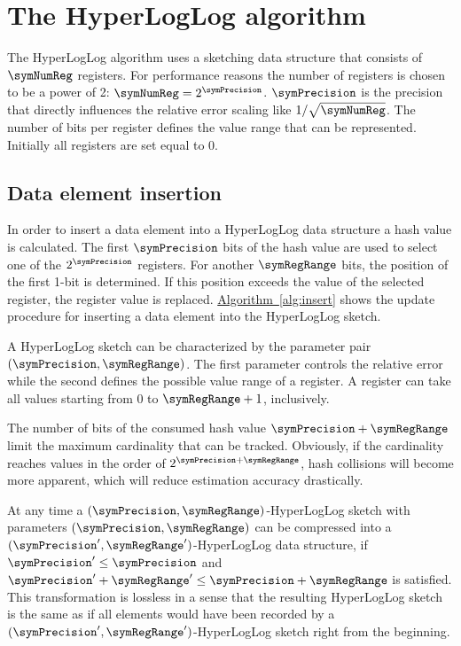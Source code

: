 \documentclass[11pt]{article} %
\newcommand*{\algoref}[1]{\hyperref[#1]{Algorithm~\ref*{#1}}}
\begin{document}

\section{The HyperLogLog algorithm}
The HyperLogLog algorithm uses a sketching data structure that consists of $\symNumReg$ registers. For performance reasons the number of registers is chosen to be a power of 2: $\symNumReg = 2^\symPrecision$. $\symPrecision$ is the precision that directly influences the relative error scaling like $1/\sqrt{\symNumReg}$. The number of bits per register defines the value range that can be represented. Initially all registers are set equal to 0. 


\subsection{Data element  insertion}
In order to insert a data element into a HyperLogLog data structure a hash value is calculated. The first $\symPrecision$ bits of the hash value are used to select one of the $2^\symPrecision$ registers. For another $\symRegRange$ bits, the position of the first 1-bit is determined. If this position exceeds the value of the selected register, the register value is replaced. \algoref{alg:insert} shows the update procedure for inserting a data element into the HyperLogLog sketch.

A HyperLogLog sketch can be characterized by the parameter pair $(\symPrecision, \symRegRange)$. The first parameter controls the relative error while the second defines the possible value range of a register. A register can take all values starting from 0 to $\symRegRange+1$, inclusively. 

The number of bits of the consumed hash value $\symPrecision+\symRegRange$ limit the maximum cardinality that can be tracked. Obviously, if the cardinality reaches values in the order of $2^{\symPrecision+\symRegRange}$, hash collisions will become more apparent, which will reduce estimation accuracy drastically.

At any time a $(\symPrecision, \symRegRange)$-HyperLogLog sketch with parameters $(\symPrecision, \symRegRange)$ can be compressed into a $(\symPrecision', \symRegRange')$-HyperLogLog data structure, if $\symPrecision'\leq\symPrecision$ and $\symPrecision'+\symRegRange' \leq\symPrecision + \symRegRange$ is satisfied. This transformation is lossless in a sense that the resulting HyperLogLog sketch is the same as if all elements would have been recorded by a $(\symPrecision', \symRegRange')$-HyperLogLog sketch right from the beginning.
\end{document}

